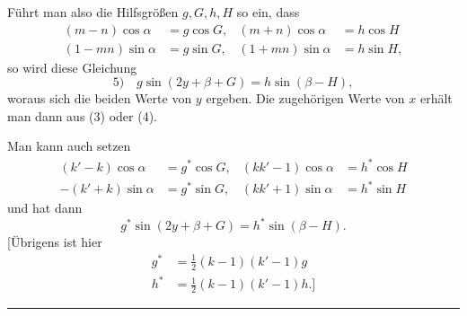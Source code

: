 Führt man also die Hilfsgrößen \(g,G,h,H\) so ein, dass
\[
\begin{aligned}
(m-n)\cos\alpha&=g\cos G, &(m+n)\cos\alpha&=h\cos H\\
(1-mn)\sin\alpha&=g\sin G, &(1+mn)\sin\alpha&=h\sin H,
\end{aligned}
\]
so wird diese Gleichung
\[
5)\quad g\sin(2y+\beta+G)=h\sin(\beta-H),
\]
woraus sich die beiden Werte von \(y\) ergeben. Die zugehörigen Werte von \(x\) erhält man dann aus (3) oder (4).

Man kann auch setzen
\[
\begin{aligned}
(k'-k)\cos\alpha&=g^*\cos G, &(kk'-1)\cos\alpha&=h^*\cos H\\
-(k'+k)\sin\alpha&=g^*\sin G, &(kk'+1)\sin\alpha&=h^*\sin H
\end{aligned}
\]
und hat dann
\[
g^*\sin(2y+\beta+G)=h^*\sin(\beta-H).
\]
[Übrigens ist hier
\[
\begin{aligned}
g^*&=\tfrac12(k-1)(k'-1)g\\
h^*&=\tfrac12(k-1)(k'-1)h.]
\end{aligned}
\]
\begin{center}\rule{.18\textwidth}{.35pt}\end{center}
